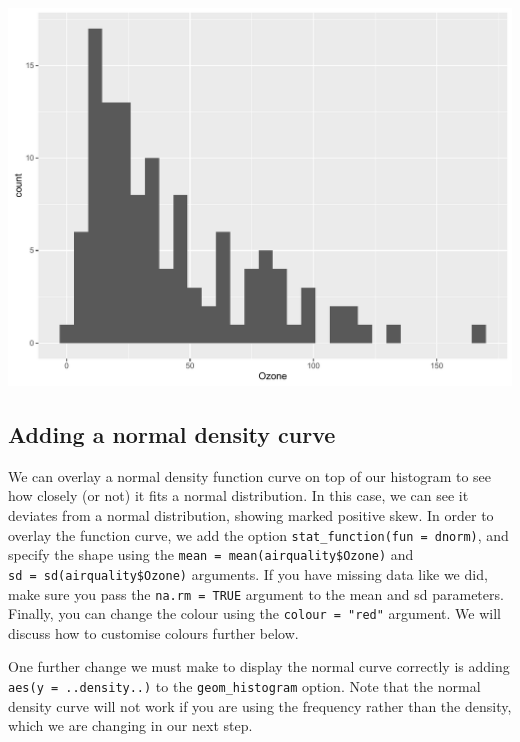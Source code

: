 \documentclass[]{article}
\begin{document}
\begin{center}\includegraphics{0_all_posts_pdf/histogram_1-1} \end{center}

\subsection{Adding a normal density
curve}\label{adding-a-normal-density-curve}

We can overlay a normal density function curve on top of our histogram
to see how closely (or not) it fits a normal distribution. In this case,
we can see it deviates from a normal distribution, showing marked
positive skew. In order to overlay the function curve, we add the option
\texttt{stat\_function(fun\ =\ dnorm)}, and specify the shape using the
\texttt{mean\ =\ mean(airquality\$Ozone)} and
\texttt{sd\ =\ sd(airquality\$Ozone)} arguments. If you have missing
data like we did, make sure you pass the \texttt{na.rm\ =\ TRUE}
argument to the mean and sd parameters. Finally, you can change the
colour using the \texttt{colour\ =\ "red"} argument. We will discuss how
to customise colours further below.

One further change we must make to display the normal curve correctly is
adding \texttt{aes(y\ =\ ..density..)} to the \texttt{geom\_histogram}
option. Note that the normal density curve will not work if you are
using the frequency rather than the density, which we are changing in
our next step.
\end{document}

